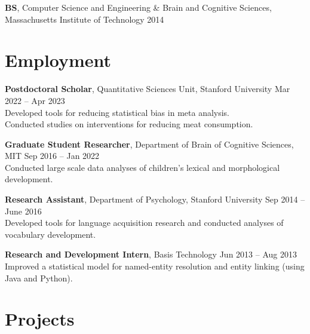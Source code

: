 \documentclass[11pt,]{article}
\begin{document}
\textbf{BS}, Computer Science and Engineering \& Brain and Cognitive
Sciences, Massachusetts Institute of Technology \hfill 2014

\hypertarget{employment}{%
\section{\texorpdfstring{\faLaptop \hspace{1pt}
Employment}{ Employment}}\label{employment}}

\textbf{Postdoctoral Scholar}, Quantitative Sciences Unit, Stanford
University \hfill Mar 2022 -- Apr 2023\\
\hspace*{0.333em}\hspace*{0.333em}\hspace*{0.333em}Developed tools for
reducing statistical bias in meta analysis.\\
\hspace*{0.333em}\hspace*{0.333em}\hspace*{0.333em}Conducted studies on
interventions for reducing meat consumption.

\textbf{Graduate Student Researcher}, Department of Brain of Cognitive
Sciences, MIT \hfill Sep 2016 -- Jan 2022\\
\hspace*{0.333em}\hspace*{0.333em}\hspace*{0.333em}Conducted large scale
data analyses of children's lexical and morphological development.

\textbf{Research Assistant}, Department of Psychology, Stanford
University \hfill Sep 2014 -- June 2016\\
\hspace*{0.333em}\hspace*{0.333em}\hspace*{0.333em}Developed tools for
language acquisition research and conducted analyses of vocabulary
development.

\textbf{Research and Development Intern}, Basis Technology \hfill Jun
2013 -- Aug 2013\\
\hspace*{0.333em}\hspace*{0.333em}\hspace*{0.333em}Improved a
statistical model for named-entity resolution and entity linking (using
Java and Python).

\hypertarget{projects}{%
\section{\texorpdfstring{\faCube \hspace{1pt}
Projects}{ Projects}}\label{projects}}
\end{document}
